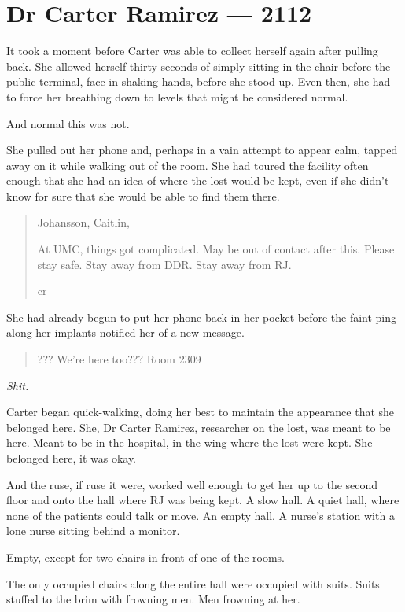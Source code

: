 \hypertarget{dr-carter-ramirez-2112}{%
\chapter*{Dr Carter Ramirez — 2112}\label{dr-carter-ramirez-2112}}

It took a moment before Carter was able to collect herself again after pulling back. She allowed herself thirty seconds of simply sitting in the chair before the public terminal, face in shaking hands, before she stood up. Even then, she had to force her breathing down to levels that might be considered normal.

And normal this was not.

She pulled out her phone and, perhaps in a vain attempt to appear calm, tapped away on it while walking out of the room. She had toured the facility often enough that she had an idea of where the lost would be kept, even if she didn't know for sure that she would be able to find them there.

\begin{quote}
Johansson, Caitlin,

At UMC, things got complicated. May be out of contact after this. Please stay safe. Stay away from DDR. Stay away from RJ.

cr
\end{quote}

She had already begun to put her phone back in her pocket before the faint ping along her implants notified her of a new message.

\begin{quote}
??? We're here too??? Room 2309
\end{quote}

\emph{Shit.}

Carter began quick-walking, doing her best to maintain the appearance that she belonged here. She, Dr Carter Ramirez, researcher on the lost, was meant to be here. Meant to be in the hospital, in the wing where the lost were kept. She belonged here, it was okay.

And the ruse, if ruse it were, worked well enough to get her up to the second floor and onto the hall where RJ was being kept. A slow hall. A quiet hall, where none of the patients could talk or move. An empty hall. A nurse's station with a lone nurse sitting behind a monitor.

Empty, except for two chairs in front of one of the rooms.

The only occupied chairs along the entire hall were occupied with suits. Suits stuffed to the brim with frowning men. Men frowning at her.

